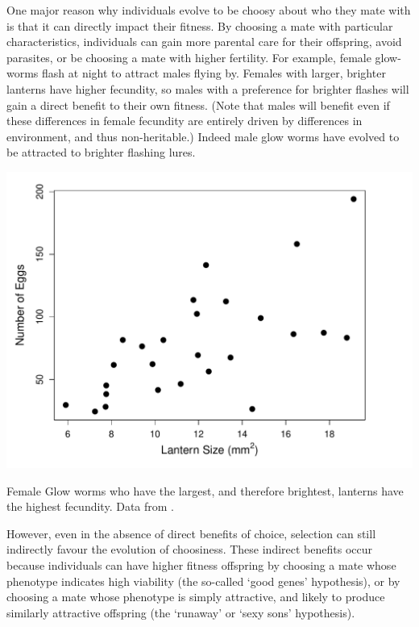 One major reason why individuals evolve to be choosy about who they mate with is that it can directly impact their fitness. By choosing a mate with
particular characteristics, individuals can gain more parental care for
their offspring, avoid parasites, or be choosing a mate with higher fertility. For example,  female glow-worms flash at night to attract males flying by. Females with larger, brighter lanterns have higher fecundity, so
males with a preference for brighter flashes will gain a direct benefit to their own fitness. (Note that males will benefit even if these differences in female fecundity are entirely driven by differences in environment, and thus non-heritable.) Indeed male glow worms have evolved to be attracted to brighter
flashing lures.  
\begin{marginfigure}[-0.5cm]
\begin{center}
\includegraphics[width= \textwidth]{Journal_figs/Quant_gen/glow_worm_flashes/glow_worm_flashes.pdf}
\end{center}
\caption{Female Glow worms who have the largest, and therefore
  brightest, lanterns have the highest fecundity. Data from
  \citet{hopkins2015m}.  } \label{fig:glow_worms_lantern}
\end{marginfigure}
However, even in the absence of direct benefits of choice, selection can still indirectly favour the evolution of choosiness. These
indirect benefits occur because individuals can have higher fitness
offspring by choosing a mate whose phenotype indicates high viability
(the so-called `good genes' hypothesis), or by choosing a mate whose
phenotype is simply attractive, and likely to produce similarly
attractive offspring (the `runaway' or `sexy sons' hypothesis).

